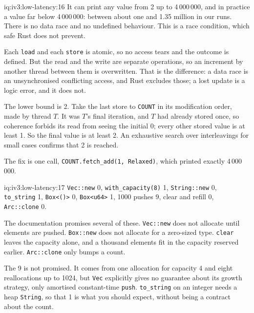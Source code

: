 \begin{solution}{iq:iv3:low-latency:16}
It can print any value from 2 up to 4\,000\,000, and in practice a value far below 4\,000\,000: between about one and 1.35 million in our runs. There is no data race and no undefined behaviour. This is a race condition, which safe Rust does not prevent.

Each \texttt{load} and each \texttt{store} is atomic, so no access tears and the outcome is defined. But the read and the write are separate operations, so an increment by another thread between them is overwritten. That is the difference: a data race is an unsynchronised conflicting access, and Rust excludes those; a lost update is a logic error, and it does not.

The lower bound is 2. Take the last store to \texttt{COUNT} in its modification order, made by thread $T$. It was $T$'s final iteration, and $T$ had already stored once, so coherence forbids its read from seeing the initial 0; every other stored value is at least 1. So the final value is at least 2. An exhaustive search over interleavings for small cases confirms that 2 is reached.

The fix is one call, \texttt{COUNT.fetch\_add(1, Relaxed)}, which printed exactly 4\,000\,000.

\end{solution}

\begin{solution}{iq:iv3:low-latency:17}
\texttt{Vec::new} 0, \texttt{with\_capacity(8)} 1, \texttt{String::new} 0, \texttt{to\_string} 1, \texttt{Box<()>} 0, \texttt{Box<u64>} 1, 1000 pushes 9, clear and refill 0, \texttt{Arc::clone} 0.

The documentation promises several of these. \texttt{Vec::new} does not allocate until elements are pushed. \texttt{Box::new} does not allocate for a zero-sized type. \texttt{clear} leaves the capacity alone, and a thousand elements fit in the capacity reserved earlier. \texttt{Arc::clone} only bumps a count.

The 9 is not promised. It comes from one allocation for capacity 4 and eight reallocations up to 1024, but \texttt{Vec} explicitly gives no guarantee about its growth strategy, only amortised constant-time \texttt{push}. \texttt{to\_string} on an integer needs a heap \texttt{String}, so that 1 is what you should expect, without being a contract about the count.

\end{solution}

